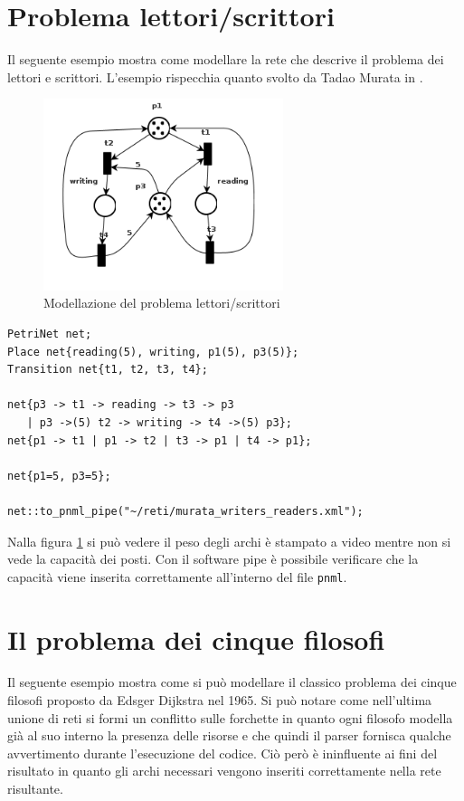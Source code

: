 \documentclass[italian,12pt]{book}
\begin{document}
\section{Problema lettori/scrittori}
Il seguente esempio mostra come modellare la rete che descrive il problema dei lettori e scrittori. L'esempio rispecchia quanto svolto da Tadao Murata in \cite{MURATA}.

\begin{figure}[htb]
\centerline{\includegraphics[width=7cm]{img/murata_writers_readers.png}}
\caption{Modellazione del problema lettori/scrittori}\label{fig:let_scrit.png}
\end{figure}

\begin{verbatim}PetriNet net;
Place net{reading(5), writing, p1(5), p3(5)};
Transition net{t1, t2, t3, t4};

net{p3 -> t1 -> reading -> t3 -> p3 
   | p3 ->(5) t2 -> writing -> t4 ->(5) p3};
net{p1 -> t1 | p1 -> t2 | t3 -> p1 | t4 -> p1};

net{p1=5, p3=5};

net::to_pnml_pipe("~/reti/murata_writers_readers.xml");
\end{verbatim}

Nalla figura \ref{fig:let_scrit.png} si può vedere il peso degli archi è stampato a video mentre non si vede la capacità dei posti. Con il software pipe è possibile verificare che la capacità viene inserita correttamente all'interno del file {\tt pnml}.

\section{Il problema dei cinque filosofi}
Il seguente esempio mostra come si può modellare il classico problema
dei cinque filosofi proposto da Edsger Dijkstra nel 1965. Si può
notare come nell'ultima unione di reti si formi un conflitto sulle
forchette in quanto ogni filosofo modella già al suo interno la
presenza delle risorse e che quindi il parser fornisca qualche
avvertimento durante l'esecuzione del codice. Ciò però è ininfluente
ai fini del risultato in quanto gli archi necessari vengono inseriti
correttamente nella rete risultante.
\end{document}
